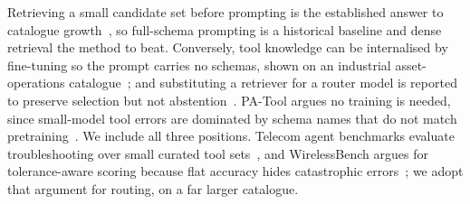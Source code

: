 Retrieving a small candidate set before prompting is the established answer to
catalogue growth~\cite{ragmcp,toollery}, so full-schema prompting is a
historical baseline and dense retrieval the method to beat. Conversely, tool
knowledge can be internalised by fine-tuning so the prompt carries no schemas,
shown on an industrial asset-operations catalogue~\cite{qlora_tools}; and
substituting a retriever for a router model is reported to preserve selection
but not abstention~\cite{ondevice_routing}. PA-Tool argues no training is
needed, since small-model tool errors are dominated by schema names that do not
match pretraining~\cite{patool}. We include all three positions. Telecom agent
benchmarks evaluate troubleshooting over small curated tool
sets~\cite{telcoagent,ctbench}, and WirelessBench argues for tolerance-aware
scoring because flat accuracy hides catastrophic errors~\cite{wirelessbench};
we adopt that argument for routing, on a far larger catalogue.
